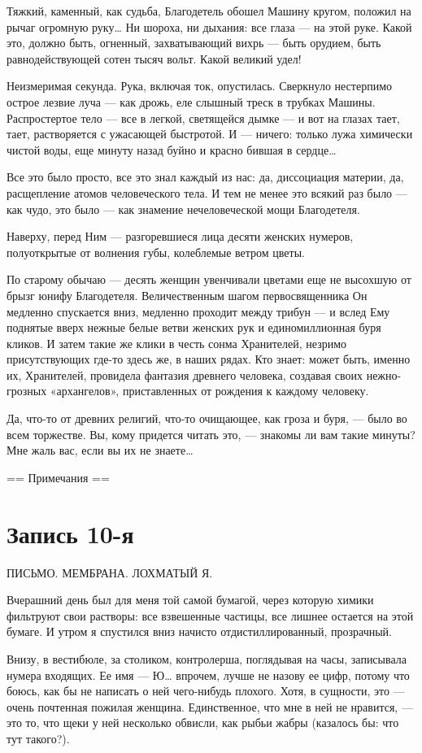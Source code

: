 \documentclass[11pt,openany]{book}
\newcommand{\bookchapterplain}[1]{%
  \clearpage\phantomsection\chapter*{#1}%
  \addcontentsline{toc}{chapter}{#1}\markboth{#1}{#1}\thispagestyle{plain}}
\begin{document}
Тяжкий, каменный, как судьба, Благодетель обошел Машину кругом, положил на рычаг огромную руку\ldots{} Ни шороха, ни дыхания: все глаза --- на этой руке. Какой это, должно быть, огненный, захватывающий вихрь --- быть орудием, быть равнодействующей сотен тысяч вольт. Какой великий удел!

Неизмеримая секунда. Рука, включая ток, опустилась. Сверкнуло нестерпимо острое лезвие луча --- как дрожь, еле слышный треск в трубках Машины. Распростертое тело --- все в легкой, светящейся дымке --- и вот на глазах тает, тает, растворяется с ужасающей быстротой. И --- ничего: только лужа химически чистой воды, еще минуту назад буйно и красно бившая в сердце\ldots{}

Все это было просто, все это знал каждый из нас: да, диссоциация материи, да, расщепление атомов человеческого тела. И тем не менее это всякий раз было --- как чудо, это было --- как знамение нечеловеческой мощи Благодетеля.

Наверху, перед Ним --- разгоревшиеся лица десяти женских нумеров, полуоткрытые от волнения губы, колеблемые ветром цветы.

По старому обычаю --- десять женщин увенчивали цветами еще не высохшую от брызг юнифу Благодетеля. Величественным шагом первосвященника Он медленно спускается вниз, медленно проходит между трибун --- и вслед Ему поднятые вверх нежные белые ветви женских рук и единомиллионная буря кликов. И затем такие же клики в честь сонма Хранителей, незримо присутствующих где-то здесь же, в наших рядах. Кто знает: может быть, именно их, Хранителей, провидела фантазия древнего человека, создавая своих нежно-грозных «архангелов», приставленных от рождения к каждому человеку.

Да, что-то от древних религий, что-то очищающее, как гроза и буря, --- было во всем торжестве. Вы, кому придется читать это, --- знакомы ли вам такие минуты? Мне жаль вас, если вы их не знаете\ldots{}

== Примечания ==

\bookchapterplain{Запись 10-я}

\begin{center}\textsc{ПИСЬМО. МЕМБРАНА. ЛОХМАТЫЙ Я.}\end{center}

Вчерашний день был для меня той самой бумагой, через которую химики фильтруют свои растворы: все взвешенные частицы, все лишнее остается на этой бумаге. И утром я спустился вниз начисто отдистиллированный, прозрачный.

Внизу, в вестибюле, за столиком, контролерша, поглядывая на часы, записывала нумера входящих. Ее имя --- Ю\ldots{} впрочем, лучше не назову ее цифр, потому что боюсь, как бы не написать о ней чего-нибудь плохого. Хотя, в сущности, это --- очень почтенная пожилая женщина. Единственное, что мне в ней не нравится, --- это то, что щеки у ней несколько обвисли, как рыбьи жабры (казалось бы: что тут такого?).
\end{document}

